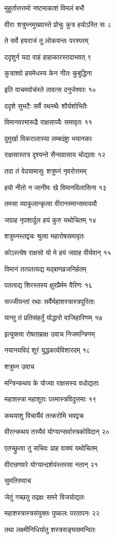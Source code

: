 मुहूर्तात्तत्तमो नष्टमाकाशं विमलं बभौ

वीराः शत्रुघ्नमुख्यास्ते प्रोचुः कुत्र हयोऽस्ति सः ८

ते सर्वे हयराजं तु लोकयन्तः परस्परम्

ददृशुर्न यदा वाहं हाहाकारस्तदाभवत् ९

कुत्राश्वो हयमेधस्य केन नीतः कुबुद्धिना

इति वाचमवोचंस्ते तावत्स दनुजेश्वरः १०

ददृशे सुभटैः सर्वै रथस्थैः शौर्यशोभितैः

विमानवरमारूढै राक्षसाग्र्यैः समावृतः ११

दुमुर्खा विकरालास्या लम्बदंष्ट्रा भयानकाः

राक्षसास्तत्र दृश्यन्ते सैन्यग्रासाय चोद्यताः १२

तदा तं वेदयामासुः शत्रुघ्नं नृवरोत्तमम्

हयो नीतो न जानीमः खे विमानविलासिना १३

तमसा व्याकुलान्कृत्वा वीरानस्मान्समाययौ

जग्राह नृपशार्दूल हयं कुरु यथोचितम् १४

शत्रुघ्नस्तद्वचः श्रुत्वा महारोषसमावृतः

कोऽस्त्येष राक्षसो यो मे हयं जग्राह वीर्यवान् १५

विमानं तत्पतत्वद्य मद्बाणव्रजनिर्हतम्

पतत्वद्य शिरस्तस्य क्षुरप्रैर्मम वैरिणः १६

सज्जीयन्तां रथाः सर्वैर्महाशस्त्रास्त्रपूरिताः

यान्तु तं प्रतिसंहर्तुं योद्धारो वाजिहारिणम् १७

इत्युक्त्वा रोषताम्राक्ष उवाच निजमन्त्रिणम्

नयानयविदं शूरं युद्धकार्यविशारदम् १८

शत्रुघ्न उवाच

मन्त्रिन्कथय के योज्या राक्षसस्य वधोद्यताः

महाशस्त्रा महाशूराः परमास्त्रविदुत्तमाः १९

कथयाशु विचार्यैवं तत्करोमि भवद्वचः

वीरान्कथय तस्यैवं योग्यान्सर्वास्त्रकोविदान् २०

एतच्छ्रुत्वा तु सचिवः प्राह वाक्यं यथोचितम्

वीरान्रणवरे योग्यान्दर्शयंस्तरसा नतान् २१

सुमतिरुवाच

जेतुं गच्छतु तद्रक्षः समरे विजयोद्यतः

महाशस्त्रास्त्रसंयुक्तः पुष्कलः परतापनः २२

तथा लक्ष्मीनिधिर्यातु शस्त्रसङ्घसमन्वितः

